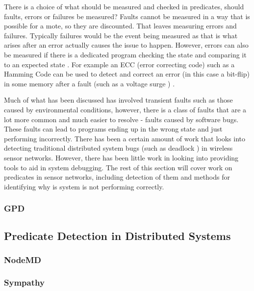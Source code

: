 There is a choice of what should be measured and checked in predicates, should faults, errors or failures be measured? Faults cannot be measured \cite{?} in a way that is possible for a mote, so they are discounted. That leaves measuring errors and failures. Typically failures would be the event being measured \cite{?} as that is what arises after an error actually causes the issue to happen. However, errors can also be measured if there is a dedicated program checking the state and comparing it to an expected state \cite{?}. For example an ECC (error correcting code) such as a Hamming Code can be used to detect and correct an error (in this case a bit-flip) in some memory after a fault (such as a voltage surge ) \cite{hamming1950error}.

Much of what has been discussed has involved transient faults such as those caused by environmental conditions, however, there is a class of faults that are a lot more common and much easier to resolve - faults caused by software bugs. These faults can lead to programs ending up in the wrong state and just performing incorrectly. There has been a certain amount of work that looks into detecting traditional distributed system bugs (such as deadlock \cite{?}) in wireless sensor networks. However, there has been little work in looking into providing tools to aid in system debugging. The rest of this section will cover work on predicates in sensor networks, including detection of them and methods for identifying why is system is not performing correctly.


\subsubsection{GPD}

\cite{345831}
\cite{277788}
\cite{553309}


\subsection{Predicate Detection in Distributed Systems}

\subsubsection{NodeMD}
\cite{NodeMD}


\subsubsection{Sympathy}

